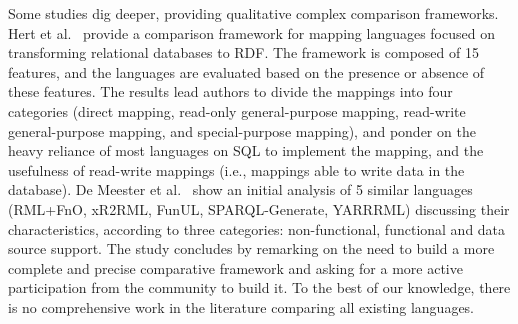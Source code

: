 Some studies dig deeper, providing qualitative complex comparison frameworks. Hert et al.~\parencite{hert2011comparison} provide a comparison framework for mapping languages focused on transforming relational databases to RDF. The framework is composed of 15 features, and the languages are evaluated based on the presence or absence of these features.%
The results lead authors to divide the mappings into four categories (direct mapping, read-only general-purpose mapping, read-write general-purpose mapping, and special-purpose mapping), and ponder on the heavy reliance of most languages on SQL to implement the mapping, and the usefulness of read-write mappings (i.e., mappings able to write data in the database). De Meester et al.~\parencite{DeMeester2019comparison} show an initial analysis of 5 similar languages (RML+FnO, xR2RML, FunUL, SPARQL-Generate, YARRRML) discussing their characteristics, according to three categories: non-functional, functional and data source support. The study concludes by remarking on the need to build a more complete and precise comparative framework and asking for a more active participation from the community to build it. To the best of our knowledge, there is no comprehensive work in the literature comparing all existing languages.  
